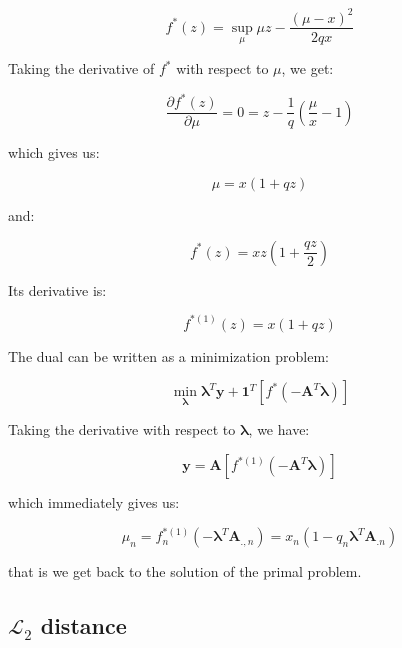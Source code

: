 \documentclass{tex/note}
\begin{document}
\begin{equation*}
f^* \left( z \right) = \sup_{\mu} \mu z - \frac{\left( \mu - x \right)^2}{2 q x}
\end{equation*}

Taking the derivative of $f^*$ with respect to $\mu$, we get:

\begin{equation*}
\frac{\partial f^* \left( z \right)}{\partial \mu} = 0 = z - \frac{1}{q} \left( \frac{\mu}{x} - 1 \right)
\end{equation*}

which gives us:

\begin{equation*}
\mu = x \left( 1 + q z \right)
\end{equation*}

and:

\begin{equation*}
f^* \left( z \right) = x z \left( 1 + \frac{q z}{2} \right)
\end{equation*}

Its derivative is:

\begin{equation*}
f^{* \left( 1 \right)} \left( z \right) = x \left( 1 + q z \right)
\end{equation*}

The dual can be written as a minimization problem:

\begin{equation*}
\min_{\bm{\lambda}} \bm{\lambda}^T \bm{y} + \bm{1}^T \left[ f^* \left( - \bm{A}^T \bm{\lambda} \right) \right] 
\end{equation*}

Taking the derivative with respect to $\bm{\lambda}$, we have:

\begin{equation*}
\bm{y} = \bm{A} \left[ f^{* \left( 1 \right)} \left( - \bm{A}^T \bm{\lambda} \right) \right]
\end{equation*}

which immediately gives us:

\begin{equation*}
\mu_n = f_n^{* \left( 1 \right)} \left( - \bm{\lambda}^T \bm{A}_{.,n} \right) = x_n \left( 1 - q_n \bm{\lambda}^T \bm{A}_{.n} \right)
\end{equation*}

that is we get back to the solution of the primal problem.

\subsection{$\mathcal{L}_2$ distance}
\end{document}
